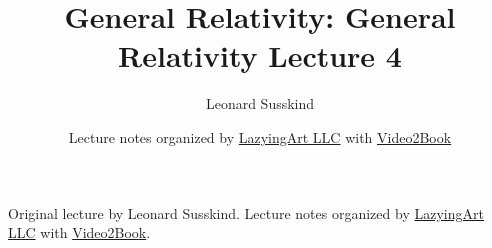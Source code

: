 \documentclass[11pt,oneside]{book}
\begin{document}
\frontmatter
\title{General Relativity: General Relativity Lecture 4}
\author{Leonard Susskind}
\date{Lecture notes organized by \href{https://lazying.art}{LazyingArt LLC} with \href{https://github.com/lachlanchen/Video2Book}{Video2Book}}
\maketitle
\begin{center}
\small Original lecture by Leonard Susskind. Lecture notes organized by \href{https://lazying.art}{LazyingArt LLC} with \href{https://github.com/lachlanchen/Video2Book}{Video2Book}.
\end{center}
\clearpage
\mainmatter

\end{document}
